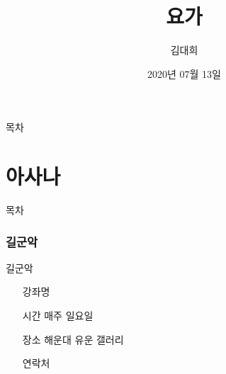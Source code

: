 \documentclass[aspectratio=1610,17pt,xcolor=pdftex,dvipsnames,table,handout]{beamer}
\begin{document}
	

			\title{ 요가 }

			\author{김대희}

			\date{ 2020년 07월 13일 }




		\begin{frame}[plain]
		\titlepage
		\end{frame}



		\begin{frame} {목차}
		\tableofcontents
		\end{frame}
		

		\part{ 아사나 }
		\frame{\partpage}


		\begin{frame} [plain]{목차}
		\tableofcontents
		\end{frame}
		

		
				
		
		\section{ 길군악 } 
		

		\begin{frame} [t,plain]
			\begin{block} { 길군악 } 

			\setlength{\leftmargini}{5em}			
			\begin{itemize}
				\item [강좌명]  
				\item [시간]  매주 일요일
				\item [장소]  해운대 유운 갤러리
				\item [연락처]  
			\end{itemize}
			
			\end{block}
		\end{frame}
		
\end{document}
